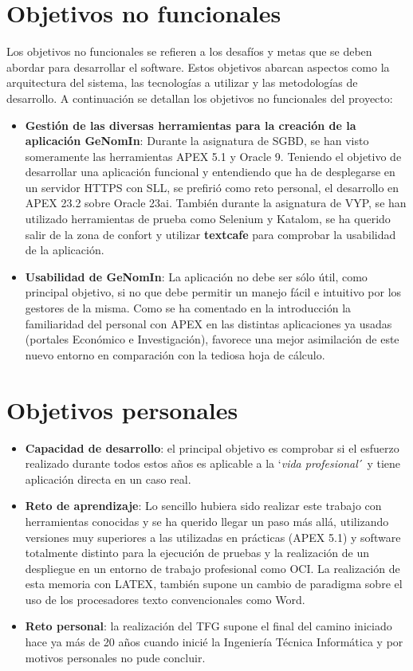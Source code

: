 \section{Objetivos no funcionales}

Los objetivos no funcionales se refieren a los desafíos y metas que se deben abordar para desarrollar el software. Estos objetivos abarcan aspectos como la arquitectura del sistema, las tecnologías a utilizar y las metodologías de desarrollo. A continuación se detallan los objetivos no funcionales del proyecto:

\begin{itemize}
	\item \textbf{Gestión de las diversas herramientas para la creación de la aplicación GeNomIn}: 
	Durante la asignatura de \acrfull{SGBD}, se han visto someramente las herramientas \acrshort{APEX} 5.1 y Oracle 9. Teniendo el objetivo de desarrollar una aplicación funcional y entendiendo que ha de desplegarse en un servidor \acrshort{HTTPS} con \gls{SLL}, se prefirió como reto personal, el desarrollo en \acrfull{APEX} 23.2 sobre Oracle 23ai. También durante la asignatura de \acrfull{VYP}, se han utilizado herramientas de prueba como Selenium y Katalom, se ha querido salir de la zona de confort y utilizar \textbf{textcafe} para comprobar la usabilidad de la aplicación.
	\item \textbf{Usabilidad de \textbf{GeNomIn}}: La aplicación no debe ser sólo útil, como principal objetivo, si no que debe permitir un manejo fácil e intuitivo por los gestores de la misma. Como se ha comentado en la introducción la familiaridad del personal con \acrfull{APEX} en las distintas aplicaciones ya usadas (portales Económico e Investigación), favorece una mejor asimilación de este nuevo entorno en comparación con la tediosa hoja de cálculo. 
\end{itemize}

\section{Objetivos personales}

\begin{itemize}
	\item \textbf{Capacidad de desarrollo}: el principal objetivo es comprobar si el esfuerzo realizado durante todos estos años es aplicable a la `\textit{vida profesional}´ y tiene aplicación directa en un caso real. 
	\item \textbf{Reto de aprendizaje}: Lo sencillo hubiera sido realizar este trabajo con herramientas conocidas y se ha querido llegar un paso más allá, utilizando versiones muy superiores a las utilizadas en prácticas (\acrshort{APEX} 5.1) y software totalmente distinto para la ejecución de pruebas y la realización de un despliegue en un entorno de trabajo profesional como \acrshort{OCI}.
	La realización de esta memoria con \gls{LATEX}, también supone un cambio de paradigma sobre el uso de los procesadores texto convencionales como Word.
	\item \textbf{Reto personal}: la realización del \acrshort{TFG} supone el final del camino iniciado hace ya más de 20 años cuando inicié la Ingeniería Técnica Informática y por motivos personales no pude concluir.
\end{itemize}